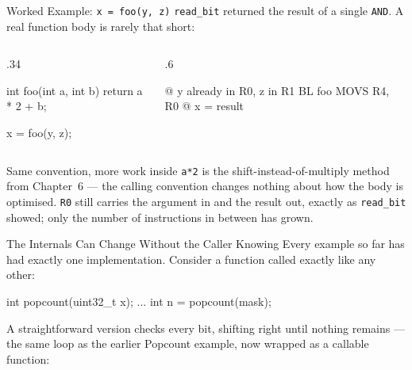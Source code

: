 \documentclass[9pt,aspectratio=169,xcolor=table]{beamer}
\begin{document}
\begin{frame}[fragile]{Worked Example: \texttt{x = foo(y, z)}}
    \leavevmode
    {\small \texttt{read\_bit} returned the result of a single \texttt{AND}.
    A real function body is rarely that short:}

    \vspace{1mm}
    \begin{columns}[T]
    \begin{column}{.34\textwidth}
        \begin{cc}[basicstyle=\normalsize\ttfamily]
int foo(int a, int b) {
    return a * 2 + b;
}

x = foo(y, z);
\end{cc}
    \end{column}
    \begin{column}{.6\textwidth}

        \vspace{2mm}
        \begin{asm}[basicstyle=\normalsize\ttfamily]
@ y already in R0, z in R1
BL    foo
MOVS  R4, R0  @ x = result
\end{asm}
    \end{column}
    \end{columns}

    \vspace{3mm}
\begin{block}{Same convention, more work inside} \texttt{a*2} is the shift-instead-of-multiply method from Chapter~6 --- the calling convention changes nothing about how the body is optimised. \texttt{R0} still carries the argument in and the result out, exactly as \texttt{read\_bit} showed; only the number of instructions in between has grown. \end{block}
\end{frame}

\begin{frame}[fragile]{The Internals Can Change Without the Caller Knowing}
    \leavevmode
    {\small Every example so far has had exactly one implementation. Consider
    a function called exactly like any other:}

    \begin{cc}
int popcount(uint32_t x);
...
int n = popcount(mask);
\end{cc}

    \vspace{2mm}
    {\small A straightforward version checks every bit, shifting right until
    nothing remains --- the same loop as the earlier Popcount example, now
    wrapped as a callable function:}

\end{frame}
\end{document}
